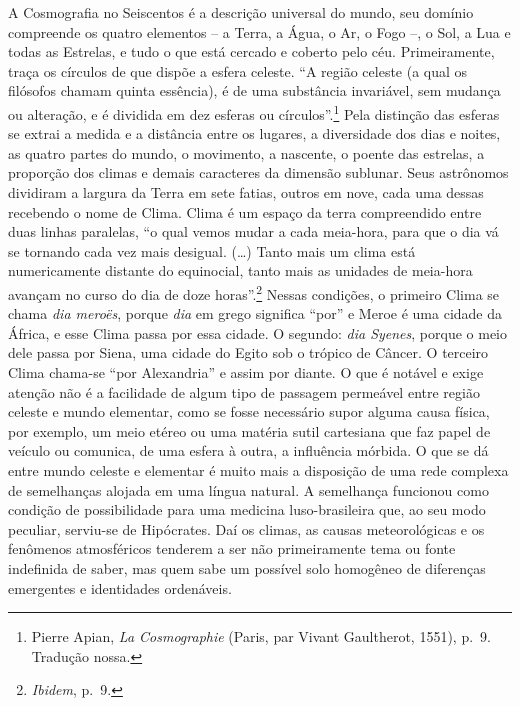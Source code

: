 A Cosmografia no Seiscentos é a descrição universal do mundo, seu
domínio compreende os quatro elementos -- a Terra, a Água, o Ar, o Fogo
--, o Sol, a Lua e todas as Estrelas, e tudo o que está cercado e
coberto pelo céu. Primeiramente, traça os círculos de que dispõe a
esfera celeste. ``A região celeste (a qual os filósofos chamam quinta
essência), é de uma substância invariável, sem mudança ou alteração, e é
dividida em dez esferas ou círculos''.\footnote{Pierre Apian, \emph{La
  Cosmographie} (Paris, par Vivant Gaultherot, 1551), p.~9. Tradução
  nossa.} Pela distinção das esferas se extrai a medida e a distância
entre os lugares, a diversidade dos dias e noites, as quatro partes do
mundo, o movimento, a nascente, o poente das estrelas, a proporção dos
climas e demais caracteres da dimensão sublunar. Seus astrônomos
dividiram a largura da Terra em sete fatias, outros em nove, cada uma
dessas recebendo o nome de Clima. Clima é um espaço da terra
compreendido entre duas linhas paralelas, ``o qual vemos mudar a cada
meia-hora, para que o dia vá se tornando cada vez mais desigual.
(\ldots{}) Tanto mais um clima está numericamente distante do
equinocial, tanto mais as unidades de meia-hora avançam no curso do dia
de doze horas''.\footnote{\emph{Ibidem}, p.~9.} Nessas condições, o
primeiro Clima se chama \emph{dia meroës}, porque \emph{dia} em grego
significa ``por'' e Meroe é uma cidade da África, e esse Clima passa por
essa cidade. O segundo: \emph{dia Syenes}, porque o meio dele passa por
Siena, uma cidade do Egito sob o trópico de Câncer. O terceiro Clima
chama-se ``por Alexandria'' e assim por diante. O que é notável e exige
atenção não é a facilidade de algum tipo de passagem permeável entre
região celeste e mundo elementar, como se fosse necessário supor alguma
causa física, por exemplo, um meio etéreo ou uma matéria sutil
cartesiana que faz papel de veículo ou comunica, de uma esfera à outra,
a influência mórbida. O que se dá entre mundo celeste e elementar é
muito mais a disposição de uma rede complexa de semelhanças alojada em
uma língua natural. A semelhança funcionou como condição de
possibilidade para uma medicina luso-brasileira que, ao seu modo
peculiar, serviu-se de Hipócrates. Daí os climas, as causas
meteorológicas e os fenômenos atmosféricos tenderem a ser não
primeiramente tema ou fonte indefinida de saber, mas quem sabe um
possível solo homogêneo de diferenças emergentes e identidades
ordenáveis.

